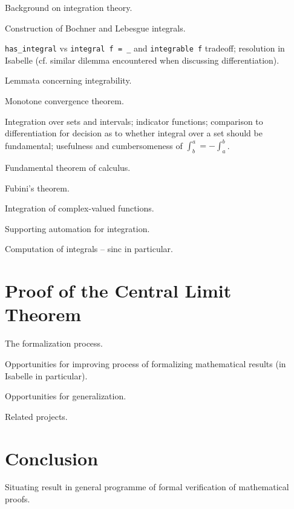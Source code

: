\documentclass{amsart}
\theoremstyle{definition}
\theoremstyle{remark}
\begin{document}
Background on integration theory.

Construction of Bochner and Lebesgue integrals.

\texttt{has\_integral} vs \texttt{integral f = \_} and \texttt{integrable f} tradeoff; resolution in Isabelle (cf. similar dilemma encountered when discussing differentiation).

Lemmata concerning integrability.

Monotone convergence theorem.

Integration over sets and intervals; indicator functions; comparison to differentiation for decision as to whether integral over a set should be fundamental; usefulness and cumbersomeness of $\int_b^a = - \int_a^b$.

Fundamental theorem of calculus.

Fubini's theorem.

Integration of complex-valued functions.

Supporting automation for integration.

Computation of integrals -- sinc in particular.

\section{Proof of the Central Limit Theorem}

The formalization process.

Opportunities for improving process of formalizing mathematical results (in Isabelle in particular).

Opportunities for generalization.

Related projects.

\section{Conclusion}

Situating result in general programme of formal verification of mathematical proofs.



\end{document}
